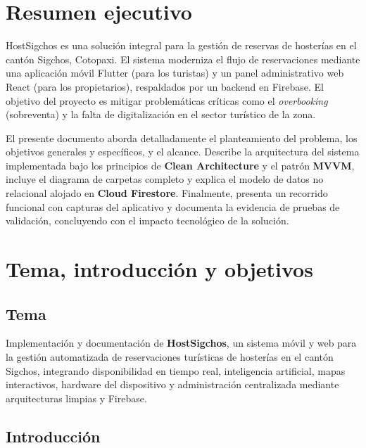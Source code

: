 \documentclass[12pt,letterpaper]{report}
\newcommand{\tech}[1]{\textbf{#1}}
\begin{document}
\pagestyle{fancy}
\fancyhf{}
\fancyfoot[C]{\thepage}
\renewcommand{\headrulewidth}{0.4pt}

\tableofcontents
\listoffigures
\listoftables
\clearpage
{}

\chapter*{Resumen ejecutivo}
HostSigchos es una solución integral para la gestión de reservas de hosterías en el cantón Sigchos, Cotopaxi. El sistema moderniza el flujo de reservaciones mediante una aplicación móvil Flutter (para los turistas) y un panel administrativo web React (para los propietarios), respaldados por un backend en Firebase. El objetivo del proyecto es mitigar problemáticas críticas como el \textit{overbooking} (sobreventa) y la falta de digitalización en el sector turístico de la zona.

El presente documento aborda detalladamente el planteamiento del problema, los objetivos generales y específicos, y el alcance. Describe la arquitectura del sistema implementada bajo los principios de \tech{Clean Architecture} y el patrón \tech{MVVM}, incluye el diagrama de carpetas completo y explica el modelo de datos no relacional alojado en \tech{Cloud Firestore}. Finalmente, presenta un recorrido funcional con capturas del aplicativo y documenta la evidencia de pruebas de validación, concluyendo con el impacto tecnológico de la solución.

\chapter{Tema, introducción y objetivos}

\section{Tema}
Implementación y documentación de \textbf{HostSigchos}, un sistema móvil y web para la gestión automatizada de reservaciones turísticas de hosterías en el cantón Sigchos, integrando disponibilidad en tiempo real, inteligencia artificial, mapas interactivos, hardware del dispositivo y administración centralizada mediante arquitecturas limpias y Firebase.

\section{Introducción}
\end{document}
